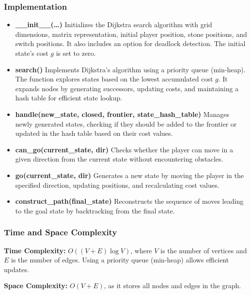 \subsubsection{Implementation}
\begin{itemize}
	\item \textbf{\_\_init\_\_(\ldots)}
	      Initializes the Dijkstra search algorithm with grid dimensions, matrix representation, initial player position, stone positions, and switch positions. It also includes an option for deadlock detection. The initial state's cost \( g \) is set to zero.

	\item \textbf{search()}
	      Implements Dijkstra's algorithm using a priority queue (min-heap). The function explores states based on the lowest accumulated cost \( g \). It expands nodes by generating successors, updating costs, and maintaining a hash table for efficient state lookup.

	\item \textbf{handle(new\_state, closed, frontier, state\_hash\_table)}
	      Manages newly generated states, checking if they should be added to the frontier or updated in the hash table based on their cost values.

	\item \textbf{can\_go(current\_state, dir)}
	      Checks whether the player can move in a given direction from the current state without encountering obstacles.

	\item \textbf{go(current\_state, dir)}
	      Generates a new state by moving the player in the specified direction, updating positions, and recalculating cost values.

	\item \textbf{construct\_path(final\_state)}
	      Reconstructs the sequence of moves leading to the goal state by backtracking from the final state.
\end{itemize}

\subsubsection{Time and Space Complexity}
\textbf{Time Complexity:} \( O((V + E) \log V) \), where \( V \) is the number of vertices and \( E \) is the number of edges. Using a priority queue (min-heap) allows efficient updates.

\textbf{Space Complexity:} \( O(V + E) \), as it stores all nodes and edges in the graph.
